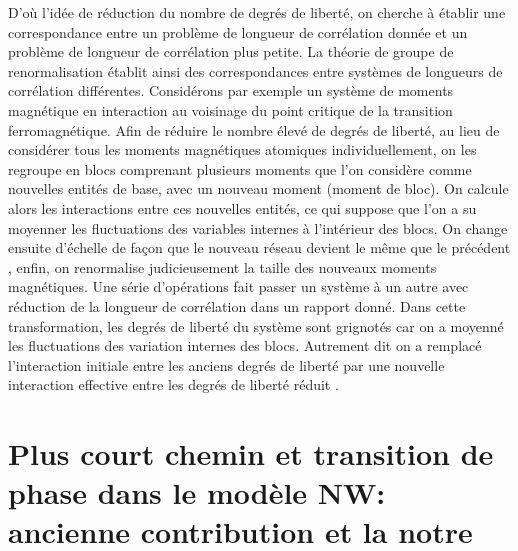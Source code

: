 D'où l'idée de réduction du nombre de degrés de liberté, on cherche à établir une correspondance entre un problème de longueur de corrélation donnée et un problème de longueur de corrélation plus petite. La théorie de groupe de renormalisation établit ainsi des correspondances entre systèmes de longueurs de corrélation différentes. Considérons par exemple un système de moments magnétique en interaction au voisinage du point critique de la transition ferromagnétique. Afin de réduire le nombre élevé de degrés de liberté, au lieu de considérer tous les moments magnétiques atomiques individuellement, on les regroupe en blocs comprenant plusieurs moments que l'on considère comme nouvelles entités de base, avec un nouveau moment (moment de bloc). On calcule alors les interactions entre ces nouvelles entités, ce qui suppose que l'on a su moyenner les fluctuations des variables internes à l'intérieur des blocs. On change ensuite d'échelle de façon que le nouveau réseau devient le même que le précédent , enfin, on renormalise judicieusement la taille des nouveaux moments magnétiques. Une série d'opérations fait passer un système à un autre avec réduction de la longueur de corrélation dans un rapport donné. Dans cette transformation, les degrés de liberté du système sont grignotés car on a moyenné les fluctuations des variation internes des blocs. Autrement dit on a remplacé l'interaction initiale entre les anciens degrés de liberté par une nouvelle interaction effective entre les degrés de liberté réduit \cite{Pelissetto-Vicari2002,Wilson1975}.

\section{Plus court chemin et transition de phase dans le modèle NW: ancienne contribution et la notre}
